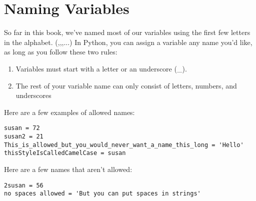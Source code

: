 \section{Naming Variables}
So far in this book, we've named most of our variables using the first
few letters in the alphabet. (,,,...) In Python, you can assign a
variable any name you'd like, as long as you follow these two rules:
\begin{enumerate}
\item Variables must start with a letter or an underscore (\_).
\item The rest of your variable name can only consist of letters,
numbers, and underscores
\end{enumerate}
Here are a few examples of allowed names:
\begin{Verbatim}
susan = 72
susan2 = 21
This_is_allowed_but_you_would_never_want_a_name_this_long = 'Hello'
thisStyleIsCalledCamelCase = susan
\end{Verbatim}
Here are a few names that aren't allowed:
\begin{Verbatim}
2susan = 56
no spaces allowed = 'But you can put spaces in strings'
\end{Verbatim}


